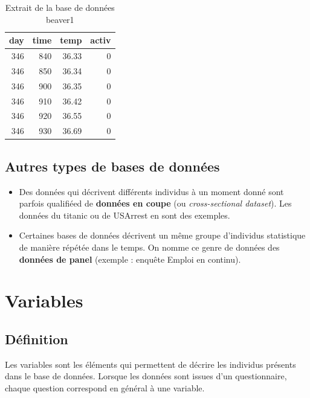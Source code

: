 \documentclass[
  french,
]{book}
\providecommand{\tightlist}{%
  \setlength{\itemsep}{0pt}\setlength{\parskip}{0pt}}
\begin{document}
\begin{table}

\caption{\label{tab:unnamed-chunk-3}Extrait de la base de données beaver1}
\centering
\begin{tabular}[t]{r|r|r|r}
\hline
day & time & temp & activ\\
\hline
346 & 840 & 36.33 & 0\\
\hline
346 & 850 & 36.34 & 0\\
\hline
346 & 900 & 36.35 & 0\\
\hline
346 & 910 & 36.42 & 0\\
\hline
346 & 920 & 36.55 & 0\\
\hline
346 & 930 & 36.69 & 0\\
\hline
\end{tabular}
\end{table}

\hypertarget{autres-types-de-bases-de-donnuxe9es}{%
\subsection{Autres types de bases de données}\label{autres-types-de-bases-de-donnuxe9es}}

\begin{itemize}
\tightlist
\item
  Des données qui décrivent différents individus à un moment donné sont parfois qualifiéed de \textbf{données en coupe} (ou \emph{cross-sectional dataset}). Les données du titanic ou de USArrest en sont des exemples.
\item
  Certaines bases de données décrivent un même groupe d'individus statistique de manière répétée dans le temps. On nomme ce genre de données des \textbf{données de panel} (exemple : enquête Emploi en continu).
\end{itemize}

\hypertarget{variables}{%
\section{Variables}\label{variables}}

\hypertarget{duxe9finition}{%
\subsection{Définition}\label{duxe9finition}}

Les variables sont les éléments qui permettent de décrire les individus présents dans le base de données. Lorsque les données sont issues d'un questionnaire, chaque question correspond en général à une variable.
\end{document}
